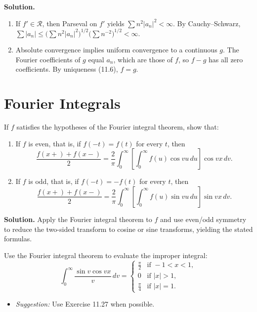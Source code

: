 \noindent\textbf{Solution.}
\begin{enumerate}[label=(\alph*)]
\item If $f'\in\mathcal R$, then Parseval on $f'$ yields $\sum n^2|a_n|^2<\infty$. By Cauchy–Schwarz, $\sum |a_n|\le\big(\sum n^2|a_n|^2\big)^{1/2}\big(\sum n^{-2}\big)^{1/2}<\infty$.
\item Absolute convergence implies uniform convergence to a continuous $g$. The Fourier coefficients of $g$ equal $a_n$, which are those of $f$, so $f-g$ has all zero coefficients. By uniqueness (11.6), $f=g$.
\end{enumerate}

\section{Fourier Integrals}

\begin{problembox}
If $f$ satisfies the hypotheses of the Fourier integral theorem, show that:
\begin{enumerate}[label=(\alph*)]
\item If $f$ is even, that is, if $f(-t) = f(t)$ for every $t$, then
\[
\frac{f(x+) + f(x-)}{2} = \frac{2}{\pi} \int_0^\infty \left[ \int_0^\infty f(u) \cos vu \, du \right] \cos vx \, dv.
\]
\item If $f$ is odd, that is, if $f(-t) = -f(t)$ for every $t$, then
\[
\frac{f(x+) + f(x-)}{2} = \frac{2}{\pi} \int_0^\infty \left[ \int_0^\infty f(u) \sin vu \, du \right] \sin vx \, dv.
\]
\end{enumerate}
\end{problembox}

\noindent\textbf{Solution.}
Apply the Fourier integral theorem to $f$ and use even/odd symmetry to reduce the two-sided transform to cosine or sine transforms, yielding the stated formulas.

\begin{problembox}
Use the Fourier integral theorem to evaluate the improper integral:
\[
\int_0^\infty \frac{\sin v \cos vx}{v} \, dv = 
\begin{cases} 
\frac{\pi}{2} & \text{if } -1 < x < 1, \\
0 & \text{if } |x| > 1, \\
\frac{\pi}{4} & \text{if } |x| = 1.
\end{cases}
\]
\begin{itemize}
\item \textit{Suggestion:} Use Exercise 11.27 when possible.
\end{itemize}
\end{problembox}

